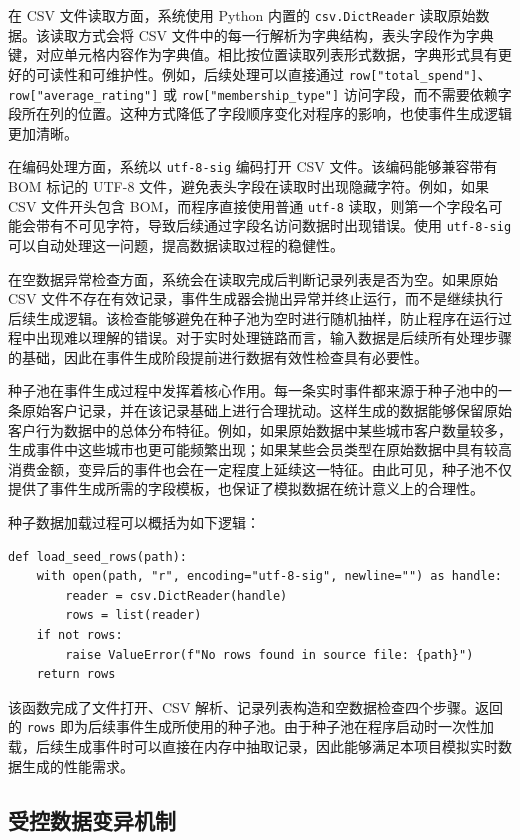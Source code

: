 \documentclass[12pt,hyperref,a4paper,UTF8]{ctexart}
\begin{document}
在 CSV 文件读取方面，系统使用 Python 内置的 \texttt{csv.DictReader} 读取原始数据。该读取方式会将 CSV 文件中的每一行解析为字典结构，表头字段作为字典键，对应单元格内容作为字典值。相比按位置读取列表形式数据，字典形式具有更好的可读性和可维护性。例如，后续处理可以直接通过 \texttt{row["total\_spend"]}、\texttt{row["average\_rating"]} 或 \texttt{row["membership\_type"]} 访问字段，而不需要依赖字段所在列的位置。这种方式降低了字段顺序变化对程序的影响，也使事件生成逻辑更加清晰。

在编码处理方面，系统以 \texttt{utf-8-sig} 编码打开 CSV 文件。该编码能够兼容带有 BOM 标记的 UTF-8 文件，避免表头字段在读取时出现隐藏字符。例如，如果 CSV 文件开头包含 BOM，而程序直接使用普通 \texttt{utf-8} 读取，则第一个字段名可能会带有不可见字符，导致后续通过字段名访问数据时出现错误。使用 \texttt{utf-8-sig} 可以自动处理这一问题，提高数据读取过程的稳健性。

在空数据异常检查方面，系统会在读取完成后判断记录列表是否为空。如果原始 CSV 文件不存在有效记录，事件生成器会抛出异常并终止运行，而不是继续执行后续生成逻辑。该检查能够避免在种子池为空时进行随机抽样，防止程序在运行过程中出现难以理解的错误。对于实时处理链路而言，输入数据是后续所有处理步骤的基础，因此在事件生成阶段提前进行数据有效性检查具有必要性。

种子池在事件生成过程中发挥着核心作用。每一条实时事件都来源于种子池中的一条原始客户记录，并在该记录基础上进行合理扰动。这样生成的数据能够保留原始客户行为数据中的总体分布特征。例如，如果原始数据中某些城市客户数量较多，生成事件中这些城市也更可能频繁出现；如果某些会员类型在原始数据中具有较高消费金额，变异后的事件也会在一定程度上延续这一特征。由此可见，种子池不仅提供了事件生成所需的字段模板，也保证了模拟数据在统计意义上的合理性。

种子数据加载过程可以概括为如下逻辑：

\begin{verbatim}
def load_seed_rows(path):
    with open(path, "r", encoding="utf-8-sig", newline="") as handle:
        reader = csv.DictReader(handle)
        rows = list(reader)
    if not rows:
        raise ValueError(f"No rows found in source file: {path}")
    return rows
\end{verbatim}

该函数完成了文件打开、CSV 解析、记录列表构造和空数据检查四个步骤。返回的 \texttt{rows} 即为后续事件生成所使用的种子池。由于种子池在程序启动时一次性加载，后续生成事件时可以直接在内存中抽取记录，因此能够满足本项目模拟实时数据生成的性能需求。

\subsection{受控数据变异机制}
\end{document}
